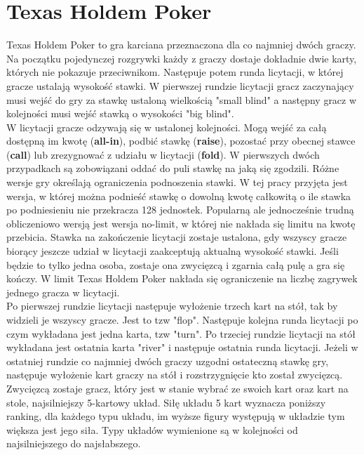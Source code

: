 \documentclass[licencjacka]{pracamgr}
\begin{document}
\section{Texas Holdem Poker}

Texas Holdem Poker to gra karciana przeznaczona dla co najmniej dwóch graczy. Na początku pojedynczej rozgrywki każdy z graczy
dostaje dokładnie dwie karty, których nie pokazuje przeciwnikom. Następuje potem runda licytacji, w której
gracze ustalają wysokość stawki. W pierwszej rundzie licytacji gracz zaczynający musi wejść do gry
za stawkę ustaloną wielkością "small blind" a następny gracz w kolejności musi wejść stawką o wysokości
"big blind". \\

\noindent
W licytacji gracze odzywają się w ustalonej kolejności. Mogą wejść za całą dostępną im kwotę (\textbf{all-in}),
podbić stawkę (\textbf{raise}), pozostać przy
obecnej stawce (\textbf{call}) lub zrezygnować z udziału w licytacji (\textbf{fold}). W pierwszych dwóch przypadkach są
zobowiązani oddać do puli stawkę na jaką się zgodzili. Różne wersje gry określają ograniczenia podnoszenia
stawki. W tej pracy przyjęta jest wersja, w której można podnieść stawkę o dowolną kwotę całkowitą o ile stawka
po podniesieniu nie przekracza 128 jednostek. Popularną ale jednocześnie trudną obliczeniowo wersją
jest wersja no-limit, w której nie nakłada się limitu na kwotę przebicia.
Stawka na zakończenie licytacji zostaje ustalona, gdy
wszyscy gracze biorący jeszcze udział w licytacji zaakceptują aktualną wysokość stawki. Jeśli będzie to
tylko jedna osoba, zostaje ona zwycięzcą i zgarnia całą pulę a gra się kończy. W limit Texas Holdem Poker
nakłada się ograniczenie na liczbę zagrywek jednego gracza w licytacji.\\

\noindent
Po pierwszej rundzie licytacji następuje wyłożenie trzech kart na stół, tak by widzieli je wszyscy gracze.
Jest to tzw "flop". Następuje kolejna runda licytacji po czym wykładana jest jedna karta, tzw "turn".
Po trzeciej rundzie licytacji na stół wykładana jest ostatnia karta "river" i następuje ostatnia runda
licytacji. Jeżeli w ostatniej rundzie co najmniej dwóch graczy uzgodni ostateczną stawkę gry, następuje
wyłożenie kart graczy na stół i rozstrzygnięcie kto został zwycięzcą. \\

\noindent
Zwycięzcą zostaje gracz, który jest w stanie wybrać ze swoich kart oraz kart na stole, najsilniejszy
5-kartowy układ. Siłę układu 5 kart wyznacza poniższy ranking, dla każdego typu układu, im wyższe
figury występują w układzie tym większa jest jego siła. Typy układów wymienione są w kolejności
od najsilniejszego do najsłabszego.
\end{document}
